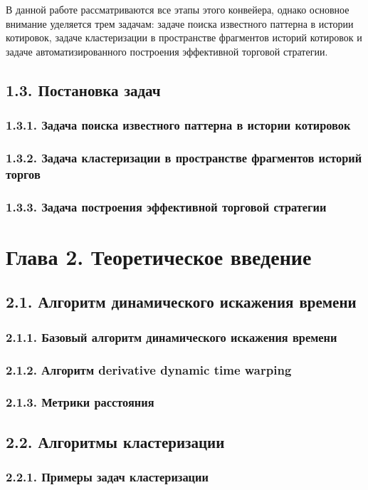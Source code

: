 \documentclass[12pt]{article}
\begin{document}
В данной работе рассматриваются все этапы этого конвейера, однако основное внимание уделяется трем задачам: задаче поиска известного паттерна в истории котировок, задаче кластеризации в пространстве фрагментов историй котировок и задаче автоматизированного построения эффективной торговой стратегии.
\subsection{1.3. Постановка задач}
\subsubsection{1.3.1. Задача поиска известного паттерна в истории котировок}
\subsubsection{1.3.2. Задача кластеризации в пространстве фрагментов историй торгов}
\subsubsection{1.3.3. Задача построения эффективной торговой стратегии}
\section{Глава 2. Теоретическое введение}
\subsection{2.1. Алгоритм динамического искажения времени}
\subsubsection{2.1.1. Базовый алгоритм динамического искажения времени}
\subsubsection{2.1.2. Алгоритм derivative dynamic time warping}
\subsubsection{2.1.3. Метрики расстояния}
\newpage{}
\subsection{2.2. Алгоритмы кластеризации}
\subsubsection{2.2.1. Примеры задач кластеризации}
\end{document}
